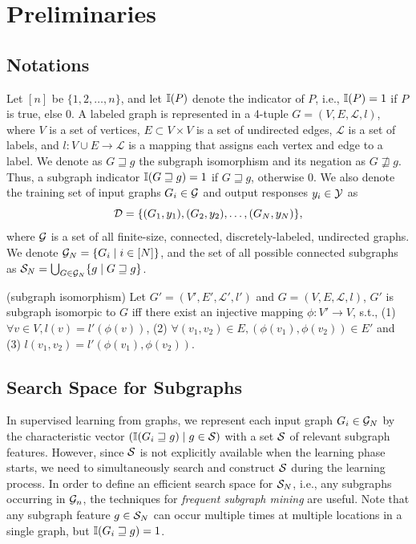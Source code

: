 \section{Preliminaries}
\subsection{Notations}
Let $[n]$ be $\{1,2,\dots,n\}$, and let $\I(P)$ denote the
indicator of $P$, i.e., $\I(P)=1$ if $P$ is true, else $0$. 
A labeled graph is represented in a 4-tuple $G = (V, E, \mathcal{L}, l)$, 
where $V$ is a set of vertices, $E \subset V \times V$ is a set of undirected edges, 
$\mathcal{L}$ is a set of labels, 
and $l: V \cup E \rightarrow \mathcal{L}$ is a mapping that assigns each vertex and edge to a label.
We denote as $G \sqsupseteq g$ the
subgraph isomorphism and its negation as $G \not\sqsupseteq g$. 
Thus, a subgraph indicator $\I(G \sqsupseteq g) = 1$ if $G \sqsupseteq g$, otherwise 0.
We also denote the training set of input graphs $G_i \in \Graph$ and output responses $y_i \in \Y$ as
\begin{equation}
  \label{eq:train_data}
  \D = \{(G_1,y_1),(G_2,y_2),\dots,(G_N,y_N)\}, 
\end{equation}
where $\Graph$ is a set of all finite-size, connected, discretely-labeled,
undirected graphs. We denote $\Graph_N = \{G_i\mid i \in [N]\}$, 
and the set of all possible connected subgraphs as $\S_N = \bigcup_{G \in \Graph_N} \{g \mid G \sqsupseteq g\}$.
\begin{definition}{(subgraph isomorphism)}
	Let $G' = (V', E', \mathcal{L}', l')$ and $G = (V, E, \mathcal{L}, l)$, 
	$G'$ is subgraph isomorpic to $G$ iff there exist an injective mapping $\phi: V' \rightarrow V$, 
	s.t., (1) $\forall v \in V, l(v) = l'(\phi(v))$, 
	(2) $\forall (v_{1}, v_{2}) \in E, (\phi(v_{1}), \phi(v_{2})) \in E'$ and
	(3) $l(v_{1}, v_{2}) = l'(\phi(v_{1}), \phi(v_{2}))$.
\end{definition}

\subsection{Search Space for Subgraphs}
\label{sec:subgraphMining}
In supervised learning from graphs, we represent each input graph $G_i \in
\Graph_N$ by the characteristic vector $(\I(G_i \sqsupseteq g) \mid g \in
\S) $ with a set $\S$ of relevant subgraph features. However, since $\S$ is not
explicitly available when the learning phase starts, we need to
simultaneously search and construct $\S$ during the learning process.
In order to define an efficient search space for $\S_N$, i.e., any subgraphs occurring in $\Graph_n$,
the techniques for \textit{frequent subgraph mining} are
useful. Note that any subgraph feature
$g \in \S_N$ can occur multiple times at multiple locations in a single graph,
but $\I(G_i \sqsupseteq g) = 1$.

